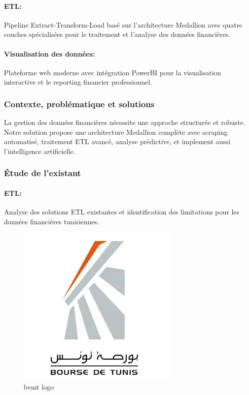 \paragraph{ETL:}
Pipeline Extract-Transform-Load basé sur l'architecture Medallion avec quatre couches spécialisées pour le traitement et l'analyse des données financières.

\paragraph{Visualisation des données:}
Plateforme web moderne avec intégration PowerBI pour la visualisation interactive et le reporting financier professionnel.

\subsubsection{Contexte, problématique et solutions}
La gestion des données financières nécessite une approche structurée et robuste. Notre solution propose une architecture Medallion complète avec scraping automatisé, traitement ETL avancé,  analyse prédictive, et implement aussi l'intelligence artificielle.

\subsubsection{Étude de l'existant}
\paragraph{ETL:}
Analyse des solutions ETL existantes et identification des limitations pour les données financières tunisiennes.
\begin{figure}[H]
    \centering
    \includegraphics[width=\figwidth]{img/bvmt logo.png}
    \caption{bvmt logo}
    \label{fig:bvmt logo}
\end{figure}


